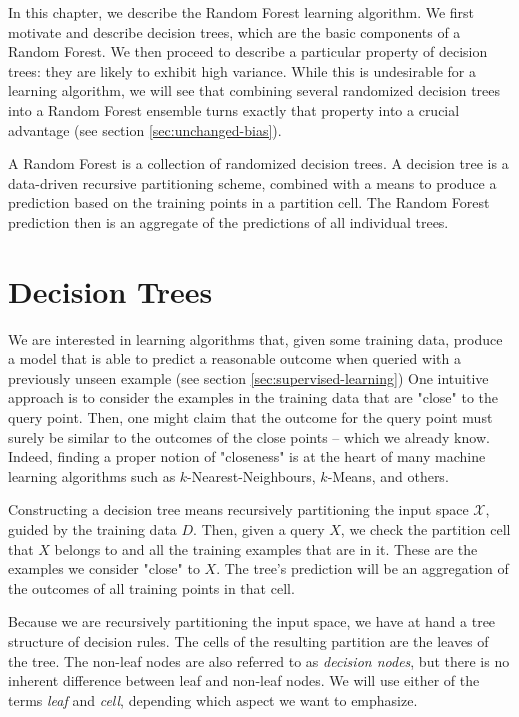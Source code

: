 \documentclass[../main.tex]{subfiles}
\begin{document}
In this chapter, we describe the Random Forest learning algorithm. We first motivate and describe decision trees, which are the basic components of a Random Forest. We then proceed to describe a particular property of decision trees: they are likely to exhibit high variance. While this is undesirable for a learning algorithm, we will see that combining several randomized decision trees into a Random Forest ensemble turns exactly that property into a crucial advantage (see section \ref{sec:unchanged-bias}).

A Random Forest is a collection of randomized decision trees. A decision tree is a data-driven recursive partitioning scheme, combined with a means to produce a prediction based on the training points in a partition cell. The Random Forest prediction then is an aggregate of the predictions of all individual trees.

\section{Decision Trees}
\label{sec:decision-trees}

We are interested in learning algorithms that, given some training data, produce a model that is able to predict a reasonable outcome when queried with a previously unseen example (see section \ref{sec:supervised-learning})
One intuitive approach is to consider the examples in the training data that are "close" to the query point. Then, one might claim that the outcome for the query point must surely be similar to the outcomes of the close points -- which we already know. Indeed, finding a proper notion of "closeness" is at the heart of many machine learning algorithms such as $k$-Nearest-Neighbours, $k$-Means, and others.

Constructing a decision tree means recursively partitioning the input space $\mathcal{X}$, guided by the training data $D$. Then, given a query $X$, we check the partition cell that $X$ belongs to
 and all the training examples that are in it. These are the examples we consider "close" to $X$. The tree's prediction will be an aggregation of the outcomes of all training points in that cell. 

Because we are recursively partitioning the input space, we have at hand a tree structure of decision rules. The cells of the resulting partition are the leaves of the tree. The non-leaf nodes are also referred to as \textit{decision nodes}, but there is no inherent difference between leaf and non-leaf nodes. We will use either of the terms \textit{leaf} and \textit{cell}, depending which aspect we want to emphasize.
\end{document}
